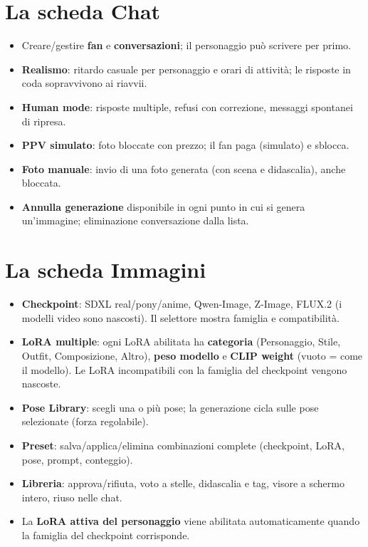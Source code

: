 \documentclass[11pt,a4paper]{article}
\begin{document}
\section{La scheda Chat}
\begin{itemize}
  \item Creare/gestire \textbf{fan} e \textbf{conversazioni}; il personaggio pu\`o scrivere per primo.
  \item \textbf{Realismo}: ritardo casuale per personaggio e orari di attivit\`a; le risposte in coda sopravvivono ai riavvii.
  \item \textbf{Human mode}: risposte multiple, refusi con correzione, messaggi spontanei di ripresa.
  \item \textbf{PPV simulato}: foto bloccate con prezzo; il fan paga (simulato) e sblocca.
  \item \textbf{Foto manuale}: invio di una foto generata (con scena e didascalia), anche bloccata.
  \item \textbf{Annulla generazione} disponibile in ogni punto in cui si genera un'immagine; eliminazione conversazione dalla lista.
\end{itemize}

\section{La scheda Immagini}
\begin{itemize}
  \item \textbf{Checkpoint}: SDXL real/pony/anime, Qwen-Image, Z-Image, FLUX.2 (i modelli video sono nascosti). Il selettore mostra famiglia e compatibilit\`a.
  \item \textbf{LoRA multiple}: ogni LoRA abilitata ha \textbf{categoria} (Personaggio, Stile, Outfit, Composizione, Altro), \textbf{peso modello} e \textbf{CLIP weight} (vuoto = come il modello). Le LoRA incompatibili con la famiglia del checkpoint vengono nascoste.
  \item \textbf{Pose Library}: scegli una o pi\`u pose; la generazione cicla sulle pose selezionate (forza regolabile).
  \item \textbf{Preset}: salva/applica/elimina combinazioni complete (checkpoint, LoRA, pose, prompt, conteggio).
  \item \textbf{Libreria}: approva/rifiuta, voto a stelle, didascalia e tag, visore a schermo intero, riuso nelle chat.
  \item La \textbf{LoRA attiva del personaggio} viene abilitata automaticamente quando la famiglia del checkpoint corrisponde.
\end{itemize}
\end{document}
